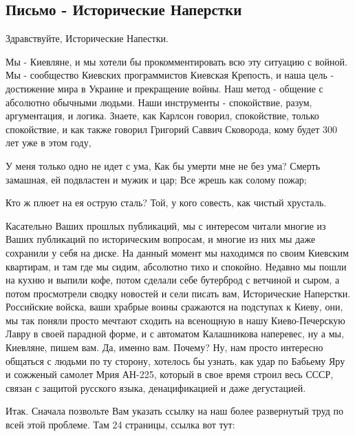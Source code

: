  
 
 
 
 

\subsection{Письмо - Исторические Наперстки}
\label{sec:moje.texts.05_02_2022.istoricheskie_naperstki}

Здравствуйте, Исторические Напестки.

Мы - Киевляне, и мы хотели бы прокомментировать всю эту ситуацию с войной.  Мы
- сообщество Киевских программистов Киевская Крепость, и наша цель - достижение
мира в Украине и прекращение войны.  Наш метод - общение с абсолютно обычными
людьми. Наши инструменты - спокойствие, разум, аргументация, и логика. Знаете,
как Карлсон говорил, спокойствие, только спокойствие, и как также говорил
Григорий Саввич Сковорода, кому будет 300 лет уже в этом году,

У меня только одно не идет с ума,
Как бы умерти мне не без ума?
Смерть замашная, ей подвластен и мужик и цар;
Все жрешь как солому пожар;

Кто ж плюет на ея острую сталь?
Той, у кого совесть, как чистый хрусталь.

Касательно Ваших прошлых публикаций, мы с интересом читали многие из Ваших
публикаций по историческим вопросам, и многие из них мы даже сохранили у себя
на диске. На данный момент мы находимся по своим Киевским квартирам, и там где
мы сидим, абсолютно тихо и спокойно. Недавно мы пошли на кухню и выпили кофе,
потом сделали себе бутерброд с ветчиной и сыром, а потом просмотрели сводку
новостей и сели писать вам, Исторические Наперстки. Российские войска, ваши
храбрые воины сражаются на подступах к Киеву, они, мы так поняли просто мечтают
сходить на всенощную в нашу Киево-Печерскую Лавру в своей парадной форме, и с
автоматом Калашникова наперевес, ну а мы, Киевляне, пишем вам. Да, именно вам.
Почему?  Ну, нам просто интересно общаться с людьми по ту сторону, хотелось бы
узнать, как удар по Бабьему Яру и сожженый самолет Мрия АН-225, который в свое
время строил весь СССР, связан с защитой русского языка, денацификацией и даже
дегустацией.

Итак. Сначала позвольте Вам указать ссылку на наш более развернутый труд по
всей этой проблеме. Там 24 страницы, ссылка вот тут:

